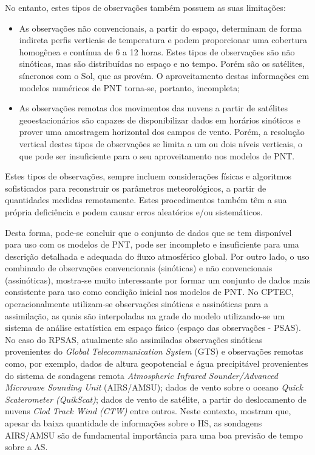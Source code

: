 No entanto, estes tipos de observações também possuem as suas limitações:

\begin{itemize}
\item As observações não convencionais, a partir do espaço, determinam de forma indireta perfis verticais de temperatura e podem proporcionar uma cobertura homogênea e contínua de 6 a 12 horas. Estes tipos de observações são não sinóticas, mas são distribuídas no espaço e no tempo. Porém são os satélites, síncronos com o Sol, que as provém. O aproveitamento destas informações em modelos numéricos de PNT torna-se, portanto, incompleta;
\item As observações remotas dos movimentos das nuvens a partir de satélites geoestacionários são capazes de disponibilizar dados em horários sinóticos e prover uma amostragem horizontal dos campos de vento. Porém, a \-re\-so\-lu\-ção vertical destes tipos de observações se limita a um ou dois níveis verticais, o que pode ser insuficiente para o seu aproveitamento nos modelos de PNT.
\end{itemize}

Estes tipos de observações, sempre incluem considerações físicas e algoritmos sofisticados para reconstruir os parâmetros meteorológicos, a partir de quantidades medidas remotamente. Estes procedimentos também têm a sua própria deficiência e podem causar erros aleatórios e/ou sistemáticos.

Desta forma, pode-se concluir que o conjunto de dados que se tem disponível para uso com os modelos de PNT, pode ser incompleto e insuficiente para uma descrição detalhada e adequada do fluxo atmosférico global. Por outro lado, o uso combinado de observações convencionais (sinóticas) e não convencionais (assinóticas), mostra-se muito interessante por formar um conjunto de dados mais consistente para uso como condição inicial nos modelos de PNT. No CPTEC, operacionalmente utilizam-se observações sinóticas e assinóticas para a assimilação, as quais são interpoladas na grade do modelo utilizando-se um sistema de análise estatística em espaço físico (espaço das observações - PSAS). No caso do RPSAS, atualmente são assimiladas observações sinóticas provenientes do \textit{Global Telecommunication System} (GTS) e observações remotas como, por exemplo, dados de altura geopotencial e água precipitável provenientes do sistema de sondagens remota \textit{Atmospheric Infrared Sounder/Advanced Microwave Sounding Unit} (AIRS/AMSU); dados de vento sobre o oceano \textit{Quick Scaterometer (QuikScat)}; dados de vento de satélite, a partir do deslocamento de nuvens \textit{Clod Track Wind (CTW)} entre outros. Neste contexto, \cite{andreolietal07} mostram que, apesar da baixa quantidade de informações sobre o HS, as sondagens AIRS/AMSU são de fundamental importância para uma boa previsão de tempo sobre a AS.

